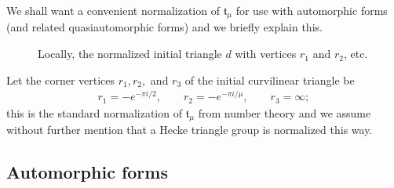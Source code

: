 \documentclass[11pt]{article}
\begin{document}
We shall want a convenient normalization of $\mathfrak{t}_\mu$ for use with automorphic forms (and related quasiautomorphic forms) and we briefly explain this.
  
  \begin{figure}[H]
        \centering
        \caption{Locally, the normalized initial triangle $ d $ with vertices $r_1$ and $r_2 $, etc.}\label{fig:LocCurveTriangle}
    \end{figure}

Let the corner vertices $ r_1, r_2, $ and $ r_3 $ of the initial curvilinear triangle be
    \begin{eqnarray}\label{normalizedVertices}
            r_1 = -{e^{-\pi i/2 }}, \qquad
            r_2 = -e^ {-\pi i/\mu}, \qquad
            r_3 = \infty;
    \end{eqnarray}
this is the standard normalization of $ \mathfrak{t}_\mu $ from number theory and we assume without further mention that a Hecke triangle group is normalized this way.

   

  


\subsection{Automorphic forms}
\end{document}
